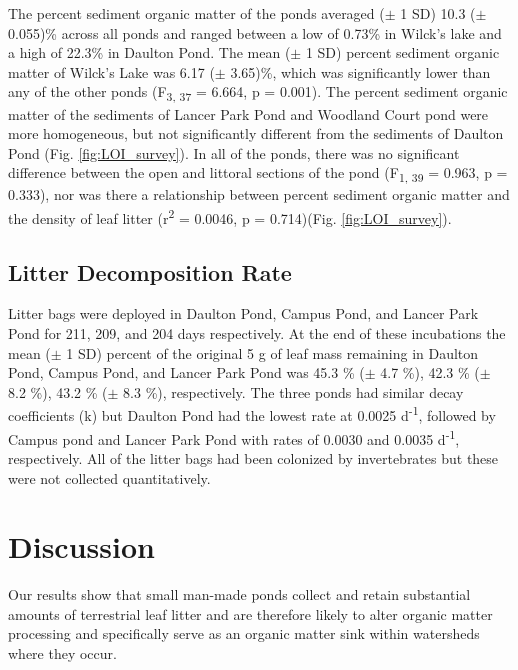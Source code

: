 \documentclass[12pt,letter]{article}
\begin{document}
The percent sediment organic matter of the ponds averaged ($\pm$ 1 SD) 10.3 ($\pm$ 0.055)\% across all ponds and ranged between a low of 0.73\% in Wilck's lake and a high of 22.3\% in Daulton Pond. The mean ($\pm$ 1 SD) percent sediment organic matter of Wilck's Lake was 6.17 ($\pm$ 3.65)\%, which was significantly lower than any of the other ponds (F\textsubscript{3, 37} = 6.664, p = 0.001). The percent sediment organic matter of the sediments of Lancer Park Pond and Woodland Court pond were more homogeneous, but not significantly different from the sediments of Daulton Pond (Fig. \ref{fig:LOI_survey}).  In all of the ponds, there was no significant difference between the open and littoral sections of the pond (F\textsubscript{1, 39} = 0.963, p = 0.333), nor was there a relationship between percent sediment organic matter and the density of leaf litter (r\textsuperscript{2} = 0.0046, p = 0.714)(Fig. \ref{fig:LOI_survey}). 

\subsection{Litter Decomposition Rate}

Litter bags were deployed in Daulton Pond, Campus Pond, and Lancer Park Pond for 211, 209, and 204 days respectively. At the end of these incubations  the mean ($\pm$ 1 SD) percent of  the original 5 g of leaf mass remaining in Daulton Pond, Campus Pond, and Lancer Park Pond was 45.3 \% ($\pm$ 4.7 \%), 42.3 \% ($\pm$ 8.2 \%), 43.2 \% ($\pm$ 8.3 \%), respectively. The three ponds had similar decay coefficients (k) but Daulton Pond had the lowest rate at 0.0025 d\textsuperscript{-1}, followed by Campus pond and Lancer Park Pond with rates of 0.0030 and 0.0035 d\textsuperscript{-1}, respectively. All of the litter bags had been colonized by invertebrates but these were not collected quantitatively.

\section{Discussion}

Our results show that small man-made ponds collect and retain substantial amounts of terrestrial leaf litter and are therefore likely to alter organic matter processing and specifically serve as an organic matter sink within watersheds where they occur.
\end{document}

